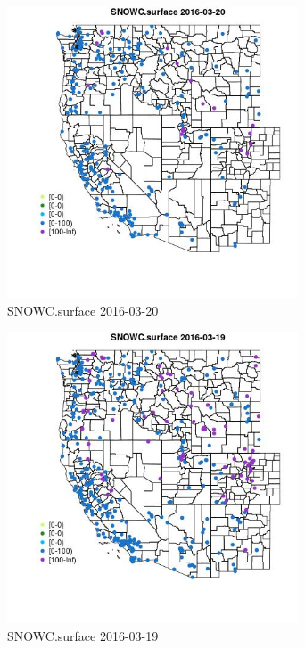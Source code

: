 \begin{figure} 
\centering  
\includegraphics[width=0.77\textwidth]{Code_Outputs/Report_ML_input_PM25_Step4_part_e_de_duplicated_aveswNAs_MapObsSNOWCsurface2016-03-20.jpg} 
\caption{\label{fig:Report_ML_input_PM25_Step4_part_e_de_duplicated_aveswNAsMapObsSNOWCsurface2016-03-20}SNOWC.surface 2016-03-20} 
\end{figure} 
 

\begin{figure} 
\centering  
\includegraphics[width=0.77\textwidth]{Code_Outputs/Report_ML_input_PM25_Step4_part_e_de_duplicated_aveswNAs_MapObsSNOWCsurface2016-03-19.jpg} 
\caption{\label{fig:Report_ML_input_PM25_Step4_part_e_de_duplicated_aveswNAsMapObsSNOWCsurface2016-03-19}SNOWC.surface 2016-03-19} 
\end{figure} 
 

